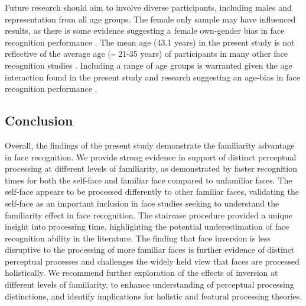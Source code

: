 \documentclass[
  10pt,
  letterpaper,
]{article}
\begin{document}
Future research should aim to involve diverse participants, including
males and representation from all age groups. The female only sample may
have influenced results, as there is some evidence suggesting a female
own-gender bias in face recognition performance
\citep{herlitz2013a, lov2011a, mishra2019a}. The mean age (43.1 years)
in the present study is not reflective of the average age
(\textasciitilde{} 21-35 years) of participants in many other face
recognition studies
\citep{kloth2006a, mohr2018a, pachai2017a, platek2009a}. Including a
range of age groups is warranted given the age interaction found in the
present study and research suggesting an age-bias in face recognition
performance \citep{rhodes2012a}.

\subsection{Conclusion}\label{conclusion}

Overall, the findings of the present study demonstrate the familiarity
advantage in face recognition. We provide strong evidence in support of
distinct perceptual processing at different levels of familiarity, as
demonstrated by faster recognition times for both the self-face and
familiar face compared to unfamiliar faces. The self-face appears to be
processed differently to other familiar faces, validating the self-face
as an important inclusion in face studies seeking to understand the
familiarity effect in face recognition. The staircase procedure provided
a unique insight into processing time, highlighting the potential
underestimation of face recognition ability in the literature. The
finding that face inversion is less disruptive to the processing of more
familiar faces is further evidence of distinct perceptual processes and
challenges the widely held view that faces are processed holistically.
We recommend further exploration of the effects of inversion at
different levels of familiarity, to enhance understanding of perceptual
processing distinctions, and identify implications for holistic and
featural processing theories.


\nolinenumbers
  
\end{document}

